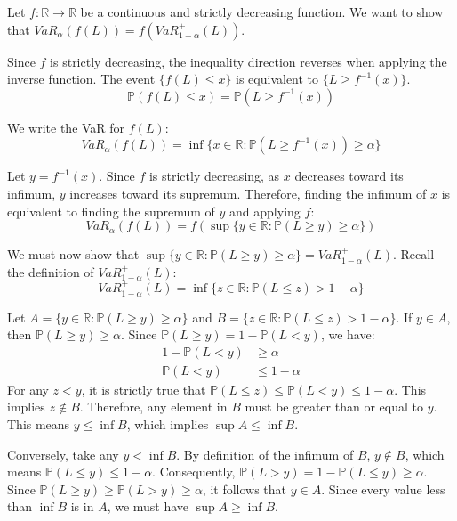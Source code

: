 Let $f: \mathbb{R} \rightarrow \mathbb{R}$ be a continuous and strictly decreasing function. We want to show that $VaR_{\alpha}(f(L)) = f(VaR_{1-\alpha}^{+}(L))$.

Since $f$ is strictly decreasing, the inequality direction reverses when applying the inverse function. The event $\{f(L) \le x\}$ is equivalent to $\{L \ge f^{-1}(x)\}$.
\begin{equation*}
\mathbb{P}(f(L) \le x) = \mathbb{P}(L \ge f^{-1}(x))
\end{equation*}

We write the VaR for $f(L)$:
\begin{equation*}
VaR_{\alpha}(f(L)) = \inf\{x \in \mathbb{R} : \mathbb{P}(L \ge f^{-1}(x)) \ge \alpha\}
\end{equation*}

Let $y = f^{-1}(x)$. Since $f$ is strictly decreasing, as $x$ decreases toward its infimum, $y$ increases toward its supremum. Therefore, finding the infimum of $x$ is equivalent to finding the supremum of $y$ and applying $f$:
\begin{equation*}
VaR_{\alpha}(f(L)) = f\left( \sup\{y \in \mathbb{R} : \mathbb{P}(L \ge y) \ge \alpha\} \right)
\end{equation*}

We must now show that $\sup\{y \in \mathbb{R} : \mathbb{P}(L \ge y) \ge \alpha\} = VaR_{1-\alpha}^{+}(L)$.
Recall the definition of $VaR_{1-\alpha}^{+}(L)$:
\begin{equation*}
VaR_{1-\alpha}^{+}(L) = \inf\{z \in \mathbb{R} : \mathbb{P}(L \le z) > 1 - \alpha\}
\end{equation*}

Let $A = \{y \in \mathbb{R} : \mathbb{P}(L \ge y) \ge \alpha\}$ and $B = \{z \in \mathbb{R} : \mathbb{P}(L \le z) > 1 - \alpha\}$.
If $y \in A$, then $\mathbb{P}(L \ge y) \ge \alpha$. Since $\mathbb{P}(L \ge y) = 1 - \mathbb{P}(L < y)$, we have:
\begin{align*}
1 - \mathbb{P}(L < y) &\ge \alpha \\
\mathbb{P}(L < y) &\le 1 - \alpha
\end{align*}
For any $z < y$, it is strictly true that $\mathbb{P}(L \le z) \le \mathbb{P}(L < y) \le 1 - \alpha$. This implies $z \notin B$. Therefore, any element in $B$ must be greater than or equal to $y$. This means $y \le \inf B$, which implies $\sup A \le \inf B$.

Conversely, take any $y < \inf B$. By definition of the infimum of $B$, $y \notin B$, which means $\mathbb{P}(L \le y) \le 1 - \alpha$. 
Consequently, $\mathbb{P}(L > y) = 1 - \mathbb{P}(L \le y) \ge \alpha$. 
Since $\mathbb{P}(L \ge y) \ge \mathbb{P}(L > y) \ge \alpha$, it follows that $y \in A$. 
Since every value less than $\inf B$ is in $A$, we must have $\sup A \ge \inf B$.

